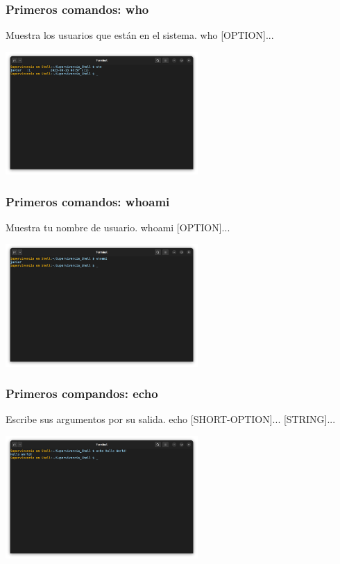 \documentclass[10pt]{beamer}
\begin{document}
	\begin{frame}
		\frametitle{Primeros comandos: who}
		\begin{alertblock}{Muestra los usuarios que están en el sistema.}
			who [OPTION]...
		\end{alertblock}
		\begin{center}
			\includegraphics[width=0.55\textwidth]{who}
		\end{center}
	\end{frame}
	
	\begin{frame}
		\frametitle{Primeros comandos: whoami}
		\begin{alertblock}{Muestra tu nombre de usuario.}
			whoami [OPTION]...
		\end{alertblock}
		\begin{center}
			\includegraphics[width=0.55\textwidth]{whoami}
		\end{center}
	\end{frame}
	
	\begin{frame}
		\frametitle{Primeros compandos: echo}
		\begin{alertblock}{Escribe sus argumentos por su salida.}
			echo [SHORT-OPTION]... [STRING]...
		\end{alertblock}
		\begin{center}
			\includegraphics[width=0.55\textwidth]{echo}
		\end{center}
	\end{frame}
	
\end{document}
